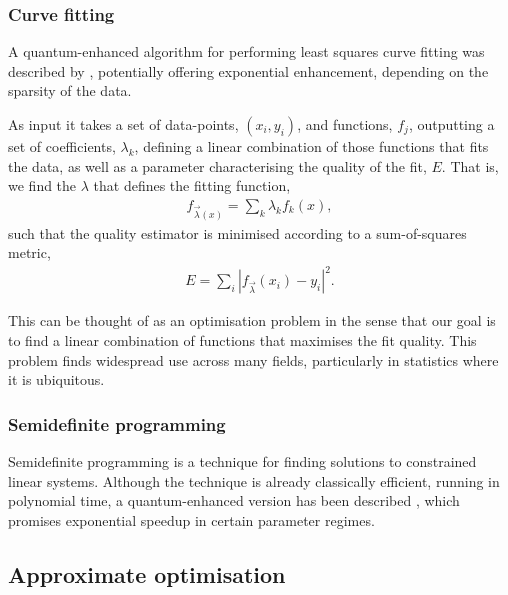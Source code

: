\subsubsection{Curve fitting}

A quantum-enhanced algorithm for performing least squares curve fitting was described by \cite{HHL?}, potentially offering exponential enhancement, depending on the sparsity of the data.

As input it takes a set of data-points, \mbox{$(x_i,y_i)$}, and functions, $f_j$, outputting a set of coefficients, $\lambda_k$, defining a linear combination of those functions that fits the data, as well as a parameter characterising the quality of the fit, $E$. That is, we find the $\lambda$ that defines the fitting function,
\begin{align}
f_{\vec\lambda(x)} = \sum_k \lambda_k f_k(x),
\end{align}
such that the quality estimator is minimised according to a sum-of-squares metric,
\begin{align}
E = \sum_i |f_{\vec\lambda}(x_i)-y_i|^2.	
\end{align}

This can be thought of as an optimisation problem in the sense that our goal is to find a linear combination of functions that maximises the fit quality. This problem finds widespread use across many fields, particularly in statistics where it is ubiquitous.

\subsubsection{Semidefinite programming}

Semidefinite programming is a technique for finding solutions to constrained linear systems. Although the technique is already classically efficient, running in polynomial time, a quantum-enhanced version has been described \cite{???}, which promises exponential speedup in certain parameter regimes.


\subsection{Approximate optimisation}

